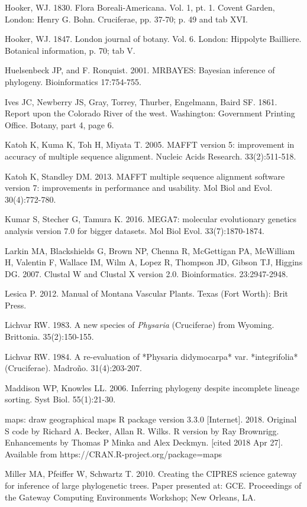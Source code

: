 Hooker, WJ. 1830. Flora Boreali-Americana. Vol. 1, pt. 1. Covent Garden, London: Henry G. Bohn. Cruciferae, pp. 37-70; p. 49 and tab XVI.

Hooker, WJ. 1847. London journal of botany. Vol. 6. London: Hippolyte Bailliere. Botanical information, p. 70; tab V.  

Huelsenbeck JP, and F. Ronquist. 2001. MRBAYES: Bayesian inference of phylogeny. Bioinformatics 17:754-755.

Ives JC, Newberry JS, Gray, Torrey, Thurber, Engelmann, Baird SF. 1861. Report upon the Colorado River of the west. Washington: Government Printing Office. Botany, part 4, page 6. 

Katoh K, Kuma K, Toh H, Miyata T. 2005. MAFFT version 5: improvement in accuracy of multiple sequence alignment. Nucleic Acids Research. 33(2):511-518.

Katoh K, Standley DM. 2013. MAFFT multiple sequence alignment software version 7: improvements in performance and usability.  Mol Biol and Evol. 30(4):772-780.

Kumar S, Stecher G, Tamura K. 2016. MEGA7: molecular evolutionary genetics analysis version 7.0 for bigger datasets. Mol Biol Evol. 33(7):1870-1874.

Larkin MA, Blackshields G, Brown NP, Chenna R, McGettigan PA, McWilliam H, Valentin F, Wallace IM, Wilm A, Lopez R, Thompson JD, Gibson TJ, Higgins DG. 2007. Clustal W and Clustal X version 2.0. Bioinformatics. 23:2947-2948. 

Lesica P. 2012. Manual of Montana Vascular Plants. Texas (Fort Worth): Brit Press.

Lichvar RW. 1983. A new species of \textit{Physaria} (Cruciferae) from Wyoming.  Brittonia. 35(2):150-155.

Lichvar RW. 1984. A re-evaluation of *Physaria didymocarpa* var. *integrifolia* (Cruciferae). Madroño. 31(4):203-207.

Maddison WP, Knowles LL. 2006. Inferring phylogeny despite incomplete lineage sorting. Syst Biol. 55(1):21-30.

maps: draw geographical maps R package version 3.3.0 [Internet]. 2018. Original S code by Richard A. Becker, Allan R. Wilks. R version by Ray Brownrigg. Enhancements by Thomas P Minka and Alex Deckmyn. [cited 2018 Apr 27]. Available from https://CRAN.R-project.org/package=maps 

Miller MA, Pfeiffer W, Schwartz T. 2010. Creating the CIPRES science gateway for inference of large phylogenetic trees. Paper presented at: GCE. Proceedings of the Gateway Computing Environments Workshop; New Orleans, LA.

